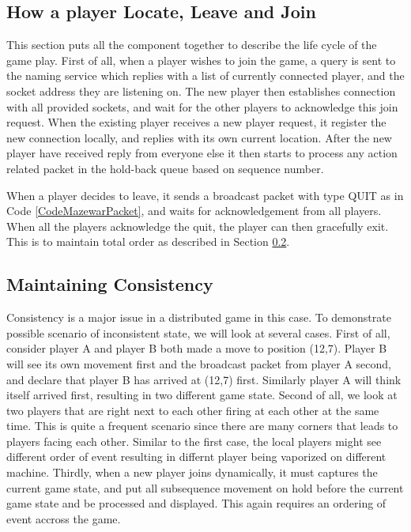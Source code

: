 \subsection{How a player Locate, Leave and Join}\label{DesignGameFlow}

This section puts all the component together to describe the life cycle of the game play. First of all, when a player wishes to join the game, a query is sent to the naming service which replies with a list of currently connected player, and the socket address they are listening on. The new player then establishes connection with all provided sockets, and wait for the other players to acknowledge this join request. When the existing player receives a new player request, it register the new connection locally, and replies with its own current location. After the new player have received reply from everyone else it then starts to process any action related packet in the hold-back queue based on sequence number.

When a player decides to leave, it sends a broadcast packet with type QUIT as in Code \ref{CodeMazewarPacket}, and waits for acknowledgement from all players. When all the players acknowledge the quit, the player can then gracefully exit. This is to maintain total order as described in Section \ref{DesignConsistency}.

\subsection{Maintaining Consistency}\label{DesignConsistency}

Consistency is a major issue in a distributed game in this case. To demonstrate possible scenario of inconsistent state, we will look at several cases. First of all, consider player A and player B both made a move to position (12,7). Player B will see its own movement first and the broadcast packet from player A second, and declare that player B has arrived at (12,7) first. Similarly player A will think itself arrived first, resulting in two different game state. Second of all, we look at two players that are right next to each other firing at each other at the same time. This is quite a frequent scenario since there are many corners that leads to players facing each other. Similar to the first case, the local players might see different order of event resulting in differnt player being vaporized on different machine. Thirdly, when a new player joins dynamically, it must captures the current game state, and put all subsequence movement on hold before the current game state and be processed and displayed. This again requires an ordering of event accross the game.

